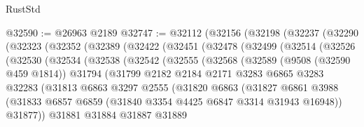 \begin{lexlean}{RustStd}
\begin{coremodule}
@32590 := @26963 @2189
@32747 := @32112
    (@32156
      (@32198
        (@32237
          (@32290
            (@32323
              (@32352
                (@32389
                  (@32422
                    (@32451
                      (@32478
                        (@32499
                          (@32514
                            (@32526
                              (@32530
                                (@32534
                                  (@32538
                                    (@32542
                                      (@32555
                                        (@32568
                                          (@32589
                                            (@9508 (@32590 @459 @1814))
                                            @31794
                                            (@31799
                                              @2182
                                              @2184
                                              @2171
                                              @3283
                                              @6865
                                              @3283
                                              @32283
                                              (@31813
                                                @6863
                                                @3297
                                                @2555
                                                (@31820
                                                  @6863
                                                  (@31827
                                                    @6861
                                                    @3988
                                                    (@31833
                                                      @6857
                                                      @6859
                                                      (@31840
                                                        @3354
                                                        @4425
                                                        @6847
                                                        @3314
                                                        @31943
                                                        @16948))
                                                    @31877))
                                                @31881
                                                @31884
                                                @31887
                                                @31889

\end{coremodule}
\end{lexlean}

